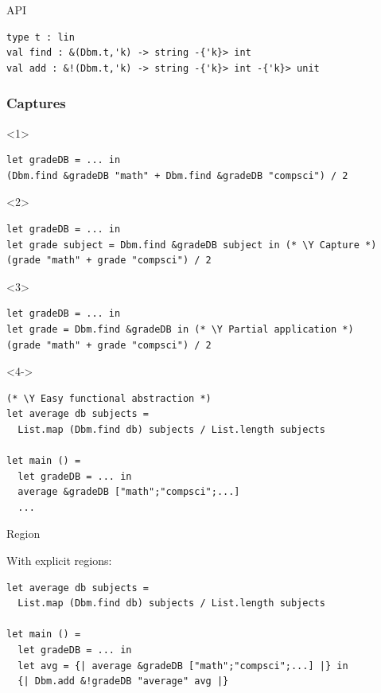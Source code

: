 \documentclass[aspectratio=169,dvipsnames,svgnames,10pt]{beamer}
\newcommand\Y{{\color{Green}{\ding{52}}}}
\begin{document}
\begin{frame}[fragile]{API}

\begin{verbatim}
type t : lin
val find : &(Dbm.t,'k) -> string -{'k}> int
val add : &!(Dbm.t,'k) -> string -{'k}> int -{'k}> unit
\end{verbatim}
  
\end{frame}

\begin{frame}[fragile]
  \frametitle{Captures}
  \begin{onlyenv}<1>
\begin{verbatim}
let gradeDB = ... in
(Dbm.find &gradeDB "math" + Dbm.find &gradeDB "compsci") / 2
\end{verbatim}
  \end{onlyenv}
  \begin{onlyenv}<2>
\begin{verbatim}
let gradeDB = ... in
let grade subject = Dbm.find &gradeDB subject in (* \Y Capture *)
(grade "math" + grade "compsci") / 2
\end{verbatim}
  \end{onlyenv}
  \begin{onlyenv}<3>
\begin{verbatim}
let gradeDB = ... in
let grade = Dbm.find &gradeDB in (* \Y Partial application *)
(grade "math" + grade "compsci") / 2
\end{verbatim}
  \end{onlyenv}
  \begin{onlyenv}<4->
\begin{verbatim}
(* \Y Easy functional abstraction *)
let average db subjects = 
  List.map (Dbm.find db) subjects / List.length subjects

let main () =
  let gradeDB = ... in
  average &gradeDB ["math";"compsci";...]
  ...
\end{verbatim}
  \end{onlyenv}
\end{frame}


\begin{frame}[fragile]{Region}

With explicit regions:
  
\begin{verbatim}
let average db subjects = 
  List.map (Dbm.find db) subjects / List.length subjects

let main () =
  let gradeDB = ... in
  let avg = {| average &gradeDB ["math";"compsci";...] |} in
  {| Dbm.add &!gradeDB "average" avg |}
\end{verbatim}
   
\end{frame}
\end{document}
